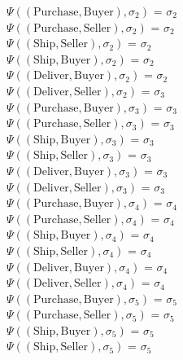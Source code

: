 \documentclass[a4paper]{article}
\begin{document}
$\Psi((\text{Purchase},\text{Buyer}),\sigma_2)$ = $\sigma_2$ \\[0.1\baselineskip] 
$\Psi((\text{Purchase},\text{Seller}),\sigma_2)$ = $\sigma_2$ \\[0.1\baselineskip] 
$\Psi((\text{Ship},\text{Seller}),\sigma_2)$ = $\sigma_2$ \\[0.1\baselineskip] 
$\Psi((\text{Ship},\text{Buyer}),\sigma_2)$ = $\sigma_2$ \\[0.1\baselineskip] 
$\Psi((\text{Deliver},\text{Buyer}),\sigma_2)$ = $\sigma_2$ \\[0.1\baselineskip] 
$\Psi((\text{Deliver},\text{Seller}),\sigma_2)$ = $\sigma_3$ \\[0.7\baselineskip] 
$\Psi((\text{Purchase},\text{Buyer}),\sigma_3)$ = $\sigma_3$ \\[0.1\baselineskip] 
$\Psi((\text{Purchase},\text{Seller}),\sigma_3)$ = $\sigma_3$ \\[0.1\baselineskip] 
$\Psi((\text{Ship},\text{Buyer}),\sigma_3)$ = $\sigma_3$ \\[0.1\baselineskip] 
$\Psi((\text{Ship},\text{Seller}),\sigma_3)$ = $\sigma_3$ \\[0.1\baselineskip] 
$\Psi((\text{Deliver},\text{Buyer}),\sigma_3)$ = $\sigma_3$ \\[0.1\baselineskip] 
$\Psi((\text{Deliver},\text{Seller}),\sigma_3)$ = $\sigma_3$ \\[0.7\baselineskip] 
$\Psi((\text{Purchase},\text{Buyer}),\sigma_4)$ = $\sigma_4$ \\[0.1\baselineskip] 
$\Psi((\text{Purchase},\text{Seller}),\sigma_4)$ = $\sigma_4$ \\[0.1\baselineskip] 
$\Psi((\text{Ship},\text{Buyer}),\sigma_4)$ = $\sigma_4$ \\[0.1\baselineskip] 
$\Psi((\text{Ship},\text{Seller}),\sigma_4)$ = $\sigma_4$ \\[0.1\baselineskip] 
$\Psi((\text{Deliver},\text{Buyer}),\sigma_4)$ = $\sigma_4$ \\[0.1\baselineskip] 
$\Psi((\text{Deliver},\text{Seller}),\sigma_4)$ = $\sigma_4$ \\[0.7\baselineskip] 
$\Psi((\text{Purchase},\text{Buyer}),\sigma_5)$ = $\sigma_5$ \\[0.1\baselineskip] 
$\Psi((\text{Purchase},\text{Seller}),\sigma_5)$ = $\sigma_5$ \\[0.1\baselineskip] 
$\Psi((\text{Ship},\text{Buyer}),\sigma_5)$ = $\sigma_5$ \\[0.1\baselineskip] 
$\Psi((\text{Ship},\text{Seller}),\sigma_5)$ = $\sigma_5$ \\[0.1\baselineskip] 
\end{document}
